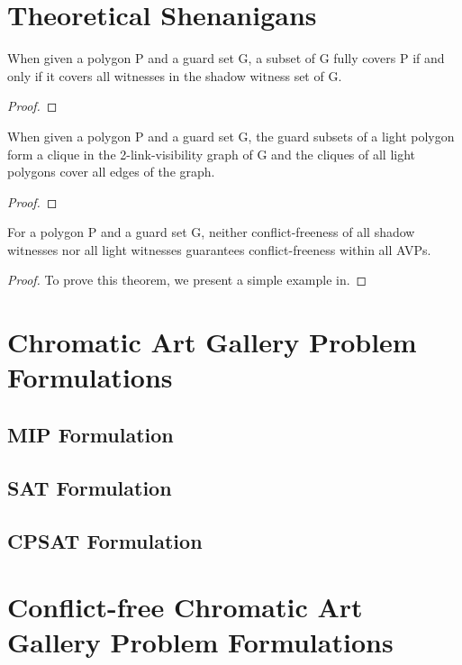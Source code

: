 \chapter{Theoretical Shenanigans}

\begin{theorem}
When given a polygon P and a guard set G, a subset of G fully covers P if and only if it covers all witnesses in the shadow witness set of G.
\end{theorem}
\begin{proof}
    
\end{proof}

\begin{theorem}
When given a polygon P and a guard set G, the guard subsets of a light polygon form a clique in the 2-link-visibility graph of G and the cliques of all light polygons cover all edges of the graph.
\end{theorem}
\begin{proof}
    
\end{proof}

\begin{theorem}
For a polygon P and a guard set G, neither conflict-freeness of all shadow witnesses nor all light witnesses guarantees conflict-freeness within all AVPs.
\end{theorem}
\begin{proof}
To prove this theorem, we present a simple example in.
\end{proof}

\chapter{Chromatic Art Gallery Problem Formulations}

\section{MIP Formulation}

\section{SAT Formulation}

\section{CPSAT Formulation}

\chapter{Conflict-free Chromatic Art Gallery Problem Formulations}

